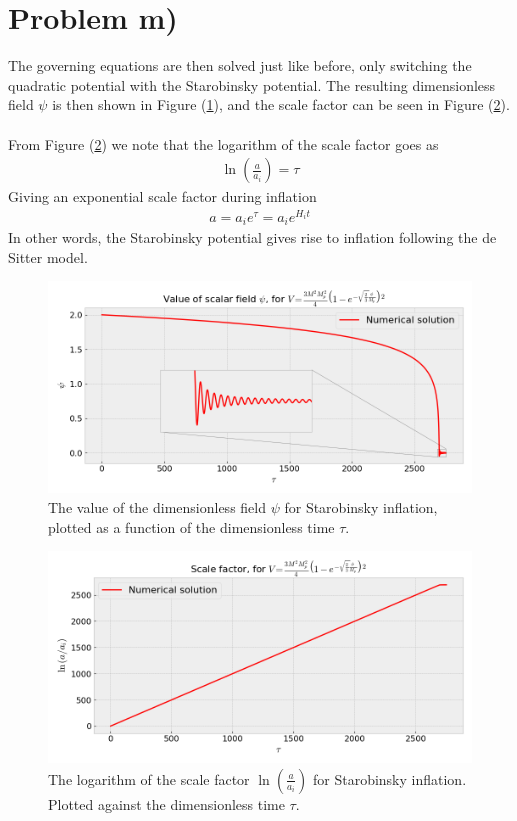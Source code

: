 \documentclass[reprint,english,notitlepage]{revtex4-1}  %
\numberwithin{equation}{section}
\begin{document}
\section{Problem m)}
The governing equations are then solved just like before, only switching the
quadratic potential with the Starobinsky potential. The resulting dimensionless
field $\psi$ is then shown in Figure (\ref{fig:Starobinsky_psi}), and the scale
factor can be seen in Figure (\ref{fig:Starobinsky_a}).
\\ \\
From Figure (\ref{fig:Starobinsky_a}) we note that the logarithm of the scale
factor goes as
\begin{align}
	\ln\left( \frac{a}{a_i}\right) = \tau
\end{align}
Giving an exponential scale factor during inflation
\begin{align}
	a = a_i e^\tau = a_i e^{H_i t}
\end{align}
In other words, the Starobinsky potential gives rise to inflation following
the de Sitter model.
\begin{figure}[h!]
	\includegraphics[width=\linewidth]{StarobinskyPotential_field-value.png}
	\caption{The value of the dimensionless field $\psi$ for Starobinsky inflation,
	plotted as a function of the dimensionless time $\tau$.}
	\label{fig:Starobinsky_psi}
\end{figure}

\begin{figure}[h!]
	\includegraphics[width=\linewidth]{StarobinskyPotential_scale-factor.png}
	\caption{The logarithm of the scale factor $\ln\left(\frac{a}{a_i}\right)$
	for Starobinsky inflation. Plotted against the dimensionless time $\tau$.}
	\label{fig:Starobinsky_a}
\end{figure}
\end{document}
